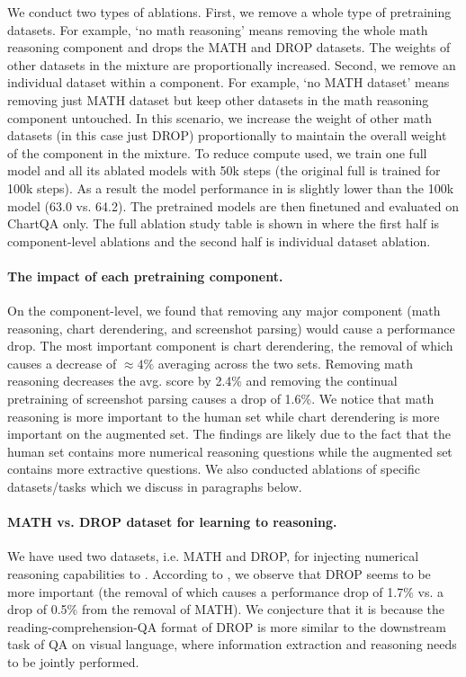 We conduct two types of ablations. First, we remove a whole type of pretraining datasets. For example, `no math reasoning' means removing the whole math reasoning component and drops the MATH and DROP datasets. The weights of other datasets in the mixture are proportionally increased. Second, we remove an individual dataset within a component. For example, `no MATH dataset' means removing just MATH dataset but keep other datasets in the math reasoning component untouched. In this scenario, we increase the weight of other math datasets (in this case just DROP) proportionally to maintain the overall weight of the component in the mixture. To reduce compute used, we train one full \model{} model and all its ablated models with 50k steps (the original full \model{} is trained for 100k steps). As a result the \model{} model performance in  is slightly lower than the 100k model (63.0 vs. 64.2). The pretrained models are then finetuned and evaluated on ChartQA only.
The full ablation study table is shown in  where the first half is component-level ablations and the second half is individual dataset ablation.

\paragraph{The impact of each pretraining component.} On the component-level, we found that removing any major component (math reasoning, chart derendering, and screenshot parsing) would cause a performance drop. The most important component is chart derendering, the removal of which causes a decrease of $\approx 4\%$ averaging across the two sets. Removing math reasoning decreases the avg. score by 2.4\% and removing the continual pretraining of screenshot parsing causes a drop of 1.6\%. We notice that math reasoning is more important to the human set while chart derendering is more important on the augmented set. The findings are likely due to the fact that the human set contains more numerical reasoning questions while the augmented set contains more extractive questions. We also conducted ablations of specific datasets/tasks which we discuss in paragraphs below.



\paragraph{MATH vs. DROP dataset for learning to reasoning.} We have used two datasets, i.e. MATH and DROP, for injecting numerical reasoning capabilities to \model{}. According to , we observe that DROP seems to be more important (the removal of which causes a performance drop of 1.7\% vs. a drop of 0.5\% from the removal of MATH). We conjecture that it is because the reading-comprehension-QA format of DROP is more similar to the downstream task of QA on visual language, where information extraction and reasoning needs to be jointly performed.

